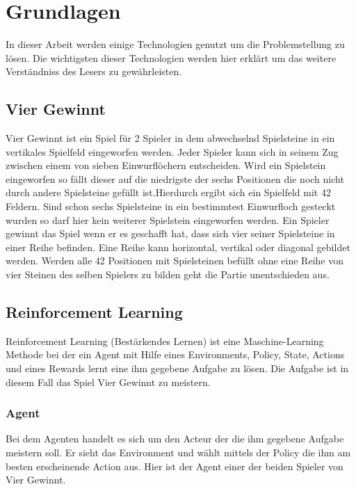 \chapter{Grundlagen}%

\label{cha:Schluss}

In dieser Arbeit werden einige Technologien genutzt um die Problemstellung zu lösen.
Die wichtigsten dieser Technologien werden hier erklärt um das weitere Verständniss des Lesers zu gewährleisten. 


\section{Vier Gewinnt}
Vier Gewinnt ist ein Spiel für 2 Spieler in dem abwechselnd Spielsteine in ein vertikales Spielfeld eingeworfen werden. Jeder Spieler kann sich in seinem Zug zwischen einem von sieben Einwurflöchern entscheiden. Wird ein Spielstein eingeworfen so fällt dieser auf die niedrigste der sechs Positionen die noch nicht durch andere Spielsteine gefüllt ist.Hierdurch ergibt sich ein Spielfeld mit 42 Feldern.  Sind schon sechs Spielsteine in ein bestimmtest Einwurfloch gesteckt wurden so darf hier kein weiterer Spielstein eingeworfen werden. Ein Spieler gewinnt das Spiel wenn er es geschafft  hat, dass sich vier seiner Spielsteine in einer Reihe befinden. Eine Reihe kann horizontal, vertikal oder diagonal gebildet werden. Werden alle 42 Positionen mit Spielsteinen befüllt ohne eine Reihe von vier Steinen des selben Spielers zu bilden geht die Partie unentschieden aus.

\section{Reinforcement Learning}
Reinforcement Learning (Bestärkendes Lernen) ist eine Maschine-Learning Methode bei der ein Agent mit Hilfe eines Environments, Policy, State, Actions und eines Rewards lernt eine ihm gegebene Aufgabe zu lösen.
Die Aufgabe ist in diesem Fall das Spiel Vier Gewinnt zu meistern.

\subsection{Agent}
Bei dem Agenten handelt es sich um den Acteur der die ihm gegebene Aufgabe meistern soll. Er sieht das Environment und wählt mittels der Policy die ihm am besten erscheinende Action aus.
Hier ist der Agent einer der beiden Spieler von Vier Gewinnt.

